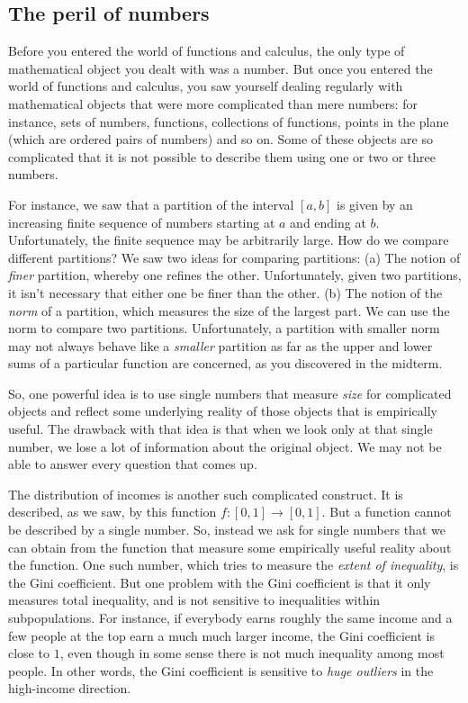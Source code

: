 \documentclass{amsart}
\begin{document}
\subsection*{The peril of numbers}

Before you entered the world of functions and calculus, the only type
of mathematical object you dealt with was a number. But once you
entered the world of functions and calculus, you saw yourself dealing
regularly with mathematical objects that were more complicated than
mere numbers: for instance, sets of numbers, functions, collections of
functions, points in the plane (which are ordered pairs of numbers)
and so on. Some of these objects are so complicated that it is not
possible to describe them using one or two or three numbers.

For instance, we saw that a partition of the interval $[a,b]$ is given
by an increasing finite sequence of numbers starting at $a$ and ending
at $b$. Unfortunately, the finite sequence may be arbitrarily
large. How do we compare different partitions? We saw two ideas for
comparing partitions: (a) The notion of {\em finer} partition, whereby
one refines the other. Unfortunately, given two partitions, it isn't
necessary that either one be finer than the other. (b) The notion of
the {\em norm} of a partition, which measures the size of the largest
part. We can use the norm to compare two partitions. Unfortunately, a
partition with smaller norm may not always behave like a {\em smaller}
partition as far as the upper and lower sums of a particular function
are concerned, as you discovered in the midterm.

So, one powerful idea is to use single numbers that measure {\em size}
for complicated objects and reflect some underlying reality of those
objects that is empirically useful. The drawback with that idea is
that when we look only at that single number, we lose a lot of
information about the original object. We may not be able to answer
every question that comes up.

The distribution of incomes is another such complicated construct. It
is described, as we saw, by this function $f:[0,1] \to [0,1]$. But a
function cannot be described by a single number. So, instead we ask
for single numbers that we can obtain from the function that measure
some empirically useful reality about the function. One such number,
which tries to measure the {\em extent of inequality}, is the Gini
coefficient. But one problem with the Gini coefficient is that it only
measures total inequality, and is not sensitive to inequalities within
subpopulations. For instance, if everybody earns roughly the same
income and a few people at the top earn a much much larger income, the
Gini coefficient is close to $1$, even though in some sense there is
not much inequality among most people. In other words, the Gini
coefficient is sensitive to {\em huge outliers} in the high-income
direction.
\end{document}
